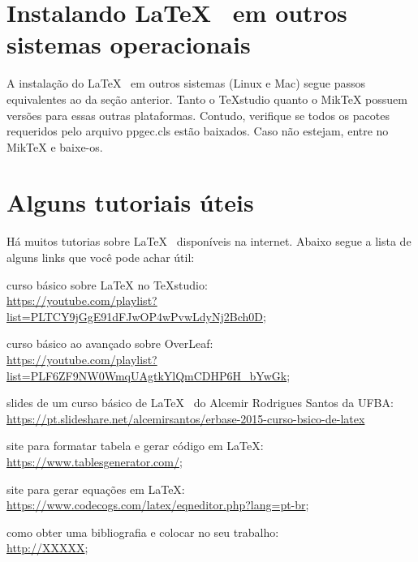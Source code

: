 \section{Instalando \LaTeX~ em outros sistemas operacionais}

A instalação do \LaTeX~ em outros sistemas (Linux e Mac) segue passos equivalentes ao da seção anterior. Tanto o TeXstudio quanto o MikTeX possuem versões para essas outras plataformas. Contudo, verifique se todos os pacotes requeridos pelo arquivo ppgec.cls estão baixados. Caso não estejam, entre no MikTeX e baixe-os.

\section{Alguns tutoriais úteis}

Há muitos tutorias sobre \LaTeX~ disponíveis na internet. Abaixo segue a lista de alguns links que você pode achar útil:

\begin{alineas}
	
	\item curso básico sobre LaTeX no TeXstudio:\\ \url{https://youtube.com/playlist?list=PLTCY9jGgE91dFJwOP4wPvwLdyNj2Bch0D};
	
	\item curso básico ao avançado sobre OverLeaf:\\ \url{https://youtube.com/playlist?list=PLF6ZF9NW0WmqUAgtkYlQmCDHP6H_bYwGk};
	
	\item slides de um curso básico de \LaTeX~ do Alcemir Rodrigues Santos da UFBA:\\ \url{https://pt.slideshare.net/alcemirsantos/erbase-2015-curso-bsico-de-latex}
	
	\item site para formatar tabela e gerar código em \LaTeX:\\ \url{https://www.tablesgenerator.com/};
	
	\item site para gerar equações em \LaTeX:\\  \url{https://www.codecogs.com/latex/eqneditor.php?lang=pt-br};
	
	\item como obter uma bibliografia e colocar no seu trabalho:\\ \url{http://XXXXX};
	
\end{alineas}


